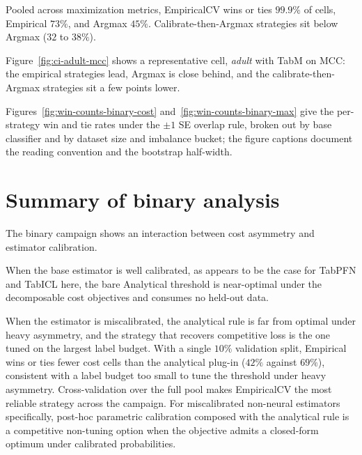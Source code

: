 Pooled across maximization metrics, EmpiricalCV wins or ties $99.9\%$ of cells, Empirical $73\%$, and Argmax $45\%$. Calibrate-then-Argmax strategies sit below Argmax ($32$ to $38\%$).

Figure~\ref{fig:ci-adult-mcc} shows a representative cell, \textit{adult} with TabM on MCC\@: the empirical strategies lead, Argmax is close behind, and the calibrate-then-Argmax strategies sit a few points lower.



Figures~\ref{fig:win-counts-binary-cost} and~\ref{fig:win-counts-binary-max} give the per-strategy win and tie rates under the $\pm 1$ SE overlap rule, broken out by base classifier and by dataset size and imbalance bucket; the figure captions document the reading convention and the bootstrap half-width.





\section{Summary of binary analysis}

The binary campaign shows an interaction between cost asymmetry and estimator calibration.

When the base estimator is well calibrated, as appears to be the case for TabPFN and TabICL here, the bare Analytical threshold is near-optimal under the decomposable cost objectives and consumes no held-out data.

When the estimator is miscalibrated, the analytical rule is far from optimal under heavy asymmetry, and the strategy that recovers competitive loss is the one tuned on the largest label budget. With a single $10\%$ validation split, Empirical wins or ties fewer cost cells than the analytical plug-in ($42\%$ against $69\%$), consistent with a label budget too small to tune the threshold under heavy asymmetry. Cross-validation over the full pool makes EmpiricalCV the most reliable strategy across the campaign. For miscalibrated non-neural estimators specifically, post-hoc parametric calibration composed with the analytical rule is a competitive non-tuning option when the objective admits a closed-form optimum under calibrated probabilities.

